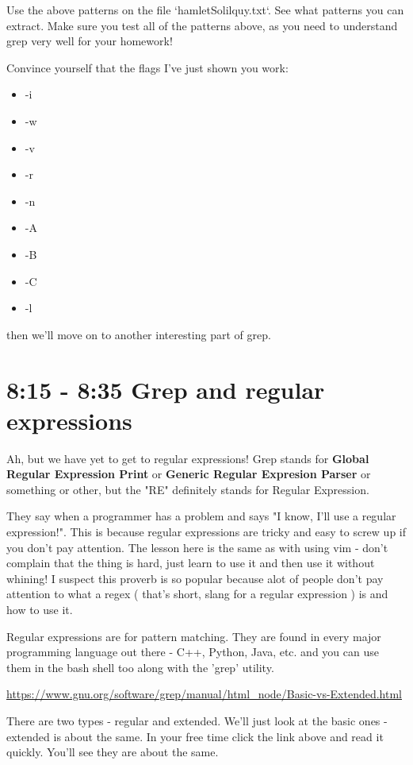 \documentclass[12pt,a4paper]{article}
\begin{document}
Use the above patterns on the file `hamletSolilquy.txt`. See what patterns you can extract. Make sure you test all of the patterns above, as you need to understand grep very well for your homework!

Convince yourself that the flags I've just shown you work:
\begin{itemize}
\item -i
\item -w
\item -v
\item -r
\item -n
\item -A
\item -B
\item -C
\item -l
\end{itemize}

then we'll move on to another interesting part of grep.

\section{8:15 - 8:35 Grep and regular expressions}

Ah, but we have yet to get to regular expressions! Grep stands for
\textbf{Global Regular Expression Print} or \textbf{Generic Regular Expresion
Parser} or something or other, but the "RE" definitely stands for Regular
Expression.

They say when a programmer has a problem and says "I know, I'll use a regular expression!". This is because regular expressions are tricky and easy to screw up if you don't pay attention. The lesson here is the same as with using vim - don't complain that the thing is hard, just learn to use it and then use it without whining! I suspect this proverb is so popular because alot of people don't pay attention to what a regex ( that's short, slang for a regular expression ) is and how to use it. 

Regular expressions are for pattern matching. They are found in every major programming language out there - C++, Python, Java, etc. and you can use them in the bash shell too along with the 'grep' utility.

\url{https://www.gnu.org/software/grep/manual/html_node/Basic-vs-Extended.html}

There are two types - regular and extended. We'll just look at the basic ones - extended is about the same. In your free time click the link above and read it quickly. You'll see they are about the same.
\end{document}
